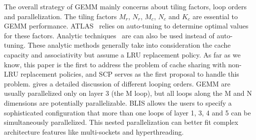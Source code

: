 The overall strategy of GEMM mainly concerns about
tiling factors, loop orders and parallelization.
The tiling factors $M_r$, $N_r$, $M_c$, $N_c$ and $K_c$
are essential to GEMM performance.
ATLAS~\cite{atlas} relies on auto-tuning to determine optimal
values for these factors.
Analytic techniques~\cite{analytic1,analytic2,blisanalytic} are
can also be used instead of auto-tuning.
These analytic methods generally take into consideration
the cache capacity and associativity
but assume a LRU replacement policy.
As far as we know, this paper is the first to
address the problem of cache sharing with non-LRU replacement policies,
and SCP serves as the first proposal to handle this problem.
\cite{gotogemm} gives a detailed discussion of different looping orders.
GEMM are usually parallelized only on layer 3 (the M loop),
but all loops along the M and N dimensions are potentially parallelizable.
BLIS\cite{blispar} allows the users to specify a sophisticated configuration
that more than one loops of layer 1, 3, 4 and 5
can be simultaneously parallelized.
This nested parallelization can better fit complex architecture features
like multi-sockets and hyperthreading. 
